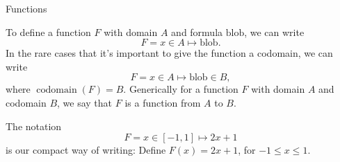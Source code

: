 \documentclass[fleqn]{beamer}
\DeclareMathOperator{\codomain}{codomain}
\theoremstyle{definition}
\newtheorem{myfact}{Fact}
\begin{document}
\begin{comment}

\begin{frame}{Vacuous Truth}  Let \(T\) be a boolean valued function. Consider the statement
\[
   (\exists x \in \varnothing)(T(x)).
\]
To show that it's true, you would have to find a member of the empty set that makes \(T\) true. There are no members of the empty set, so for any predicate \(T\), we have
\[
     (\exists x \in \varnothing)(T(x)) \equiv \mbox{false}.
\]
Thus it's negation is true; that is
\[
    (\exists x \in \varnothing)(\lnot T(x)) \equiv \mbox{true}.
\]
\begin{myfact} For any boolean valued function \(T\), we have
 \begin{align*}
  (\exists x \in \varnothing)(T(x)) \equiv \mbox{false}, \\
   (\forall x \in \varnothing)(T(x)) \equiv \mbox{true}. 
    \end{align*}
\end{myfact}

\end{frame}
\end{comment}

\begin{frame}{Functions}

To define a function \(F\) with domain \(A\) and formula \(\mbox{blob}\), we can write
\[
  F = x \in A \mapsto \mbox{blob}.
\]
In the rare cases that it's important to give the function a codomain, we can write
\[
  F = x \in A \mapsto \mbox{blob} \in B,
\]
where \(\codomain(F) = B\). Generically for a function \(F\) with domain \(A\) and codomain \(B\),  we say that \(F\) is a function from \(A\) to \(B\).

\begin{example} The notation
\[
   F = x \in [-1,1] \mapsto 2 x + 1
\]
is our compact way of writing: Define \(F(x) = 2x + 1 \), for \( -1 \leq x \leq 1\).
\end{example}
\end{frame}
\end{document}
